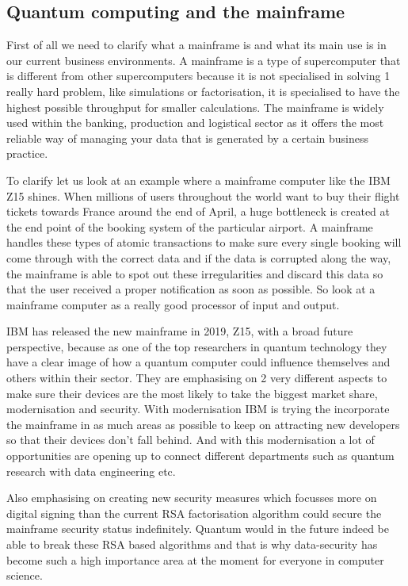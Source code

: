 \subsection{Quantum computing and the mainframe}

First of all we need to clarify what a mainframe is and what its main use is in our current business environments. A mainframe is a type of supercomputer that is different from other supercomputers because it is not specialised in solving 1 really hard problem, like simulations or factorisation, it is specialised to have the highest possible throughput for smaller calculations. The mainframe is widely used within the banking, production and logistical sector as it offers the most reliable way of managing your data that is generated by a certain business practice.

To clarify let us look at an example where a mainframe computer like the IBM Z15 shines. When millions of users throughout the world want to buy their flight tickets towards France around the end of April, a huge bottleneck is created at the end point of the booking system of the particular airport. A mainframe handles these types of atomic transactions to make sure every single booking will come through with the correct data and if the data is corrupted along the way, the mainframe is able to spot out these irregularities and discard this data so that the user received a proper notification as soon as possible. So look at a mainframe computer as a really good processor of input and output.

IBM has released the new mainframe in 2019, Z15, with a broad future perspective, because as one of the top researchers in quantum technology they have a clear image of how a quantum computer could influence themselves and others within their sector.
They are emphasising on 2 very different aspects to make sure their devices are the most likely to take the biggest market share, modernisation and security. 
With modernisation IBM is trying the incorporate the mainframe in as much areas as possible to keep on attracting new developers so that their devices don't fall behind. And with this modernisation a lot of opportunities are opening up to connect different departments such as quantum research with data engineering etc. 

Also emphasising on creating new security measures which focusses more on digital signing than the current RSA factorisation algorithm could secure the mainframe security status indefinitely. Quantum would in the future indeed be able to break these RSA based algorithms and that is why data-security has become such a high importance area at the moment for everyone in computer science.

